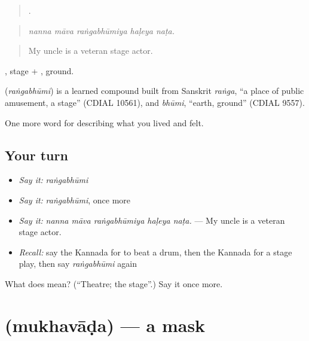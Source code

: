 \begin{quote}
    .
\end{quote}

\begin{quote}
\emph{nanna māva raṅgabhūmiya haḷeya naṭa.}
\end{quote}

\begin{quote}
My uncle is a veteran stage actor.
\end{quote}

, stage + , ground.

\begin{cousinweb}
\textbf{} (\emph{raṅgabhūmi}) is a learned compound built from Sanskrit \emph{raṅga}, \textquotedblleft{}a place of public amusement, a stage\textquotedblright{} (CDIAL 10561), and \emph{bhūmi}, \textquotedblleft{}earth, ground\textquotedblright{} (CDIAL 9557).
\end{cousinweb}

\begin{grammarlens}[title={What you've built}]
One more word for describing what you lived and felt.
\end{grammarlens}

\subsection*{Your turn}
\begin{itemize}
\raggedright
  \item \emph{Say it:} \emph{raṅgabhūmi}
  \item \emph{Say it:} \emph{raṅgabhūmi}, once more
  \item \emph{Say it:} \emph{nanna māva raṅgabhūmiya haḷeya naṭa.} — My uncle is a veteran stage actor.
  \item \emph{Recall:} say the Kannada for to beat a drum, then the Kannada for a stage play, then say \emph{raṅgabhūmi} again
\end{itemize}

\begin{tcolorbox}[breakable,colback=teal!4,colframe=teal!35!black,title={Before you move on}]
What does  mean? (\textquotedblleft{}Theatre; the stage\textquotedblright{}.) Say it once more.
\end{tcolorbox}
\section[\texorpdfstring{\kn{ಮುಖವಾಡ} (mukhavāḍa)}{ಮುಖವಾಡ (mukhavāḍa)}]{ (mukhavāḍa) — a mask}

